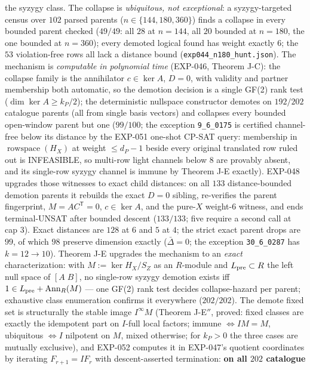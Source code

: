 \documentclass[11pt]{article}
\theoremstyle{plain}
\theoremstyle{remark}
\begin{document}
\begin{itemize}
the syzygy class. The collapse is \emph{ubiquitous, not exceptional}: a
syzygy-targeted census over $102$ parsed parents ($n\in\{144,180,360\}$) finds a
collapse in every bounded parent checked ($49/49$: all $28$ at $n{=}144$, all $20$
bounded at $n{=}180$, the one bounded at $n{=}360$); every demoted logical found has
weight exactly $6$; the $53$ violation-free rows all lack a distance bound
(\texttt{exp044\_n180\_hunt.json}). The mechanism is \emph{computable in polynomial
time} (EXP-046, Theorem J-C): the collapse family is the annihilator $c\in\ker A$,
$D=0$, with validity and partner membership both automatic, so the demotion decision
is a single GF(2) rank test ($\dim\ker A\ge k_P/2$); the deterministic nullspace
constructor demotes on $192/202$ catalogue parents (all from single basis vectors) and
collapses every bounded open-window parent but one ($99/100$; the exception
\texttt{9\_6\_0175} is certified channel-free below its distance by the EXP-051
one-shot CP-SAT query: membership in $\operatorname{rowspace}(H_X)$ at weight
$\le d_P-1$ beside every original translated row ruled out is INFEASIBLE, so
multi-row light channels below $8$ are provably absent, and its single-row
syzygy channel is immune by Theorem J-E exactly).
EXP-048 upgrades those witnesses to exact child distances: on all $133$
distance-bounded demotion parents it rebuilds the exact $D=0$ sibling, re-verifies
the parent fingerprint, $M=AC^{\mathsf T}=0$, $c\in\ker A$, and the pure-$X$
weight-$6$ witness, and ends terminal-UNSAT after bounded descent ($133/133$;
five require a second call at cap $3$). Exact distances
are $128$ at $6$ and $5$ at $4$; the strict exact parent drops are $99$, of which
$98$ preserve dimension exactly ($\bar\Delta=0$; the exception
\texttt{30\_6\_0287} has $k=12\to10$). Theorem J-E upgrades the mechanism to an
\emph{exact} characterization: with
$M:=\ker H_X/S_Z$ as an $R$-module and $L_{\rm pre}\subset R$ the left null space of
$[A\;B]$, no single-row syzygy demotion exists iff
$1\in L_{\rm pre}+\operatorname{Ann}_R(M)$ --- one GF(2) rank test decides
collapse-hazard per parent; exhaustive class enumeration confirms it everywhere
($202/202$). The demote fixed set is structurally the stable image
$I^\infty M$ (Theorem J-E${}''$, proved: fixed classes are exactly the
idempotent part on $I$-full local factors; immune $\iff IM=M$, ubiquitous
$\iff I$ nilpotent on $M$, mixed otherwise; for $k_P>0$ the three cases are
mutually exclusive), and EXP-052 computes it in
EXP-047's quotient coordinates by iterating $F_{r+1}=IF_r$ with
descent-asserted termination: \textbf{on all $202$ catalogue
}
\end{itemize}
\end{document}
